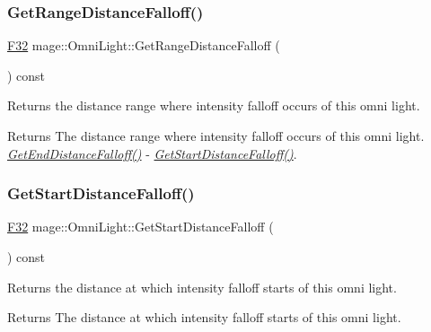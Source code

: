 \subsubsection{\texorpdfstring{Get\+Range\+Distance\+Falloff()}{GetRangeDistanceFalloff()}}
{\footnotesize\ttfamily \hyperlink{namespacemage_aa97e833b45f06d60a0a9c4fc22ae02c0}{F32} mage\+::\+Omni\+Light\+::\+Get\+Range\+Distance\+Falloff (\begin{DoxyParamCaption}{ }\end{DoxyParamCaption}) const\hspace{0.3cm}{\ttfamily [noexcept]}}

Returns the distance range where intensity falloff occurs of this omni light.

\begin{DoxyReturn}{Returns}
The distance range where intensity falloff occurs of this omni light. {\itshape \hyperlink{classmage_1_1_omni_light_abe17539c94e52b00a1182cd9780dbf77}{Get\+End\+Distance\+Falloff()}} -\/ {\itshape \hyperlink{classmage_1_1_omni_light_a32551ce9c37a3f4f6fa2ba9faba47358}{Get\+Start\+Distance\+Falloff()}}. 
\end{DoxyReturn}
\hypertarget{classmage_1_1_omni_light_a32551ce9c37a3f4f6fa2ba9faba47358}{}\label{classmage_1_1_omni_light_a32551ce9c37a3f4f6fa2ba9faba47358} 
\subsubsection{\texorpdfstring{Get\+Start\+Distance\+Falloff()}{GetStartDistanceFalloff()}}
{\footnotesize\ttfamily \hyperlink{namespacemage_aa97e833b45f06d60a0a9c4fc22ae02c0}{F32} mage\+::\+Omni\+Light\+::\+Get\+Start\+Distance\+Falloff (\begin{DoxyParamCaption}{ }\end{DoxyParamCaption}) const\hspace{0.3cm}{\ttfamily [noexcept]}}

Returns the distance at which intensity falloff starts of this omni light.

\begin{DoxyReturn}{Returns}
The distance at which intensity falloff starts of this omni light. 
\end{DoxyReturn}
\hypertarget{classmage_1_1_omni_light_a3efda1559769189e4693c6e3c570ab4b}{}\label{classmage_1_1_omni_light_a3efda1559769189e4693c6e3c570ab4b} 
